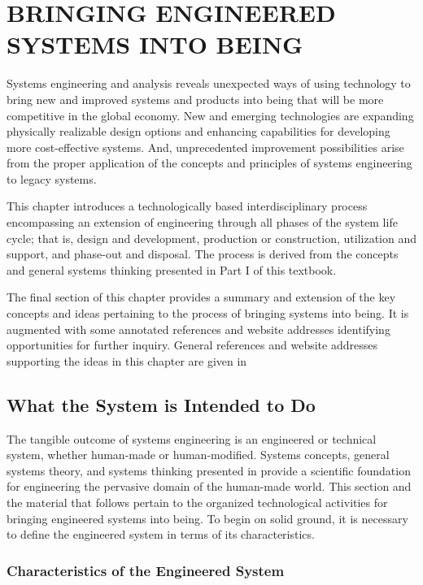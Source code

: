 \chapter{BRINGING ENGINEERED SYSTEMS INTO BEING}\label{chap:6}

Systems engineering and analysis reveals unexpected ways of using technology to bring new and improved systems and products into being that will be more competitive in the global economy. New and emerging technologies are expanding physically realizable design options and enhancing capabilities for developing more cost-effective systems. And, unprecedented improvement possibilities arise from the proper application of the concepts and principles of systems engineering to legacy systems.

This chapter introduces a technologically based interdisciplinary process encompassing an extension of engineering through all phases of the system life cycle; that is, design and development, production or construction, utilization and support, and phase-out and disposal. The process is derived from the concepts and general systems thinking presented in Part I of this textbook.

The final section of this chapter provides a summary and extension of the key concepts and ideas pertaining to the process of bringing systems into being. It is augmented with some annotated references and website addresses identifying opportunities for further inquiry. General references and website addresses supporting the ideas in this chapter are given in 

\section{What the System is Intended to Do}

The tangible outcome of systems engineering is an engineered or technical system, whether human-made or human-modified. Systems concepts, general systems theory, and systems thinking presented in provide a scientific foundation for engineering the pervasive domain of the human-made world. This section and the material that follows pertain to the organized technological activities for bringing engineered systems into being. To begin on solid ground, it is necessary to define the engineered system in terms of its characteristics.

\subsection{Characteristics of the Engineered System}

